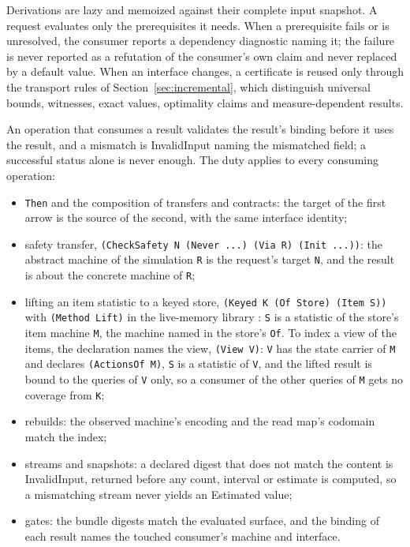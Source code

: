 \documentclass[11pt]{article}
\newcommand{\code}[1]{\texttt{#1}}
\theoremstyle{definition}
\theoremstyle{plain}
\begin{document}
Derivations are lazy and memoized against their complete input snapshot. A request evaluates only
the prerequisites it needs. When a prerequisite fails or is unresolved, the consumer reports a
dependency diagnostic naming it; the failure is never reported as a refutation of the consumer's
own claim and never replaced by a default value. When an interface changes, a certificate is
reused only through the transport rules of Section~\ref{sec:incremental}, which distinguish
universal bounds, witnesses, exact values, optimality claims and measure-dependent results.

An operation that consumes a result validates the result's binding before it uses the result, and
a mismatch is InvalidInput naming the mismatched field; a successful status alone is never enough.
The duty applies to every consuming operation:
\begin{itemize}
\item \code{Then} and the composition of transfers and contracts: the target of the first arrow is
the source of the second, with the same interface identity;
\item safety transfer, \code{(CheckSafety N (Never ...) (Via R) (Init ...))}: the abstract machine of
the simulation \code{R} is the request's target \code{N}, and the result is about the concrete
machine of \code{R};
\item lifting an item statistic to a keyed store, \code{(Keyed K (Of Store) (Item S))} with
\code{(Method Lift)} in the live-memory library \cite{livememory}: \code{S} is a statistic of the
store's item machine \code{M}, the machine named in the store's \code{Of}. To index a view of the
items, the declaration names the view, \code{(View V)}: \code{V} has the state carrier of \code{M}
and declares \code{(ActionsOf M)}, \code{S} is a statistic of \code{V}, and the lifted result is bound
to the queries of \code{V} only, so a consumer of the other queries of \code{M} gets no coverage
from \code{K};
\item rebuilds: the observed machine's encoding and the read map's codomain match the index;
\item streams and snapshots: a declared digest that does not match the content is InvalidInput,
returned before any count, interval or estimate is computed, so a mismatching stream never yields
an Estimated value;
\item gates: the bundle digests match the evaluated surface, and the binding of each result names
the touched consumer's machine and interface.
\end{itemize}
\end{document}
